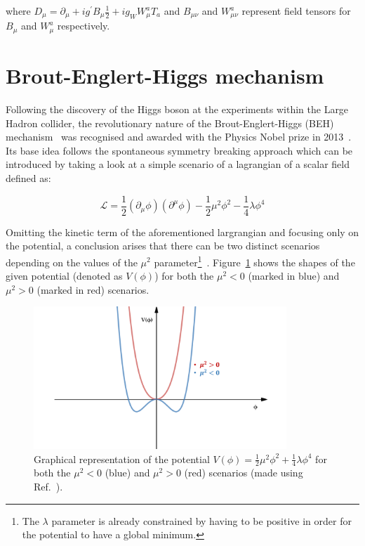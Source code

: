 where $D_\mu = \partial_\mu+ ig^{'}B_{\mu}\frac{1}{2} + ig_WW_{\mu}^aT_a$ and $B_{\mu\nu}$ and $W_{\mu\nu}^a$ represent field tensors for $B_{\mu}$ and $W_{\mu}^a$ respectively.

\section{Brout-Englert-Higgs mechanism}
\hspace{10pt} Following the discovery of the Higgs boson at the experiments within the Large Hadron collider, the revolutionary nature of the Brout-Englert-Higgs (BEH) mechanism~\cite{brout, higgs} was recognised and awarded with the Physics Nobel prize in 2013~\cite{nobel_beh}. Its base idea follows the spontaneous symmetry breaking approach which can be introduced by taking a look at a simple scenario of a lagrangian of a scalar field defined as:

\begin{equation}
    \mathcal{L} = \frac{1}{2}(\partial_{\mu}\phi)(\partial^{\mu}\phi) - \frac{1}{2}\mu^2\phi^2 - \frac{1}{4}\lambda\phi^4
\end{equation}

Omitting the kinetic term of the aforementioned largrangian and focusing only on the potential, a conclusion arises that there can be two distinct scenarios depending on the values of the $\mu^2$ parameter\footnote{The $\lambda$ parameter is already constrained by having to be positive in order for the potential to have a global minimum.}~\cite{thomson_2013,book:schwartz}. Figure~\ref{fig:higgs_potential} shows the shapes of the given potential (denoted as $V(\phi)$) for both the $\mu^2<0$ (marked in blue) and $\mu^2>0$ (marked in red) scenarios.

\begin{figure}[!htbp]
  \centering
    \includegraphics[width=0.85\textwidth]{Theory/Higgs.png}
  \caption{Graphical representation of the potential $V(\phi) = \frac{1}{2}\mu^2\phi^2 + \frac{1}{4}\lambda\phi^4$ for both the $\mu^2<0$ (blue) and $\mu^2>0$ (red) scenarios (made using Ref.~\cite{desmos}). }
  \label{fig:higgs_potential}
\end{figure}

